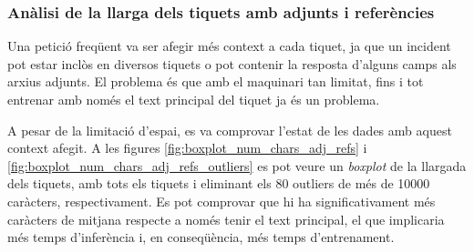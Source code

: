 \subsubsection{Anàlisi de la llarga dels tiquets amb adjunts i referències}
Una petició freqüent va ser afegir més context a cada tiquet, ja que un incident pot estar inclòs en diversos tiquets o pot contenir la resposta d'alguns camps als arxius adjunts. El problema és que amb el maquinari tan limitat, fins i tot entrenar amb només el text principal del tiquet ja és un problema. 

A pesar de la limitació d'espai, es va comprovar l'estat de les dades amb aquest context afegit. A les figures \ref{fig:boxplot_num_chars_adj_refs} i \ref{fig:boxplot_num_chars_adj_refs_outliers} es pot veure un \textit{boxplot} de la llargada dels tiquets, amb tots els tiquets i eliminant els 80 outliers de més de 10000 caràcters, respectivament. Es pot comprovar que hi ha significativament més caràcters de mitjana respecte a només tenir el text principal, el que implicaria més temps d'inferència i, en conseqüència, més temps d'entrenament.
